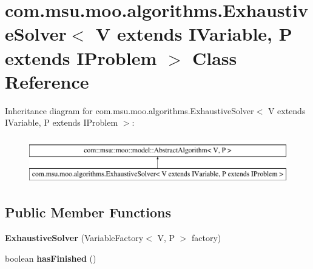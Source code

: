 \hypertarget{classcom_1_1msu_1_1moo_1_1algorithms_1_1ExhaustiveSolver_3_01V_01extends_01IVariable_00_01P_01extends_01IProblem_01_4}{\section{com.\-msu.\-moo.\-algorithms.\-Exhaustive\-Solver$<$ V extends I\-Variable, P extends I\-Problem $>$ Class Reference}
\label{classcom_1_1msu_1_1moo_1_1algorithms_1_1ExhaustiveSolver_3_01V_01extends_01IVariable_00_01P_01extends_01IProblem_01_4}
}
Inheritance diagram for com.\-msu.\-moo.\-algorithms.\-Exhaustive\-Solver$<$ V extends I\-Variable, P extends I\-Problem $>$\-:\begin{figure}[H]
\begin{center}
\leavevmode
\includegraphics[height=2.000000cm]{classcom_1_1msu_1_1moo_1_1algorithms_1_1ExhaustiveSolver_3_01V_01extends_01IVariable_00_01P_01extends_01IProblem_01_4}
\end{center}
\end{figure}
\subsection*{Public Member Functions}
\begin{DoxyCompactItemize}
\item 
\hypertarget{classcom_1_1msu_1_1moo_1_1algorithms_1_1ExhaustiveSolver_3_01V_01extends_01IVariable_00_01P_01extends_01IProblem_01_4_adecccb0b347653f660431490c7256c00}{{\bfseries Exhaustive\-Solver} (Variable\-Factory$<$ V, P $>$ factory)}\label{classcom_1_1msu_1_1moo_1_1algorithms_1_1ExhaustiveSolver_3_01V_01extends_01IVariable_00_01P_01extends_01IProblem_01_4_adecccb0b347653f660431490c7256c00}

\item 
\hypertarget{classcom_1_1msu_1_1moo_1_1algorithms_1_1ExhaustiveSolver_3_01V_01extends_01IVariable_00_01P_01extends_01IProblem_01_4_ae8001f969408d4b41260ae762ea65169}{boolean {\bfseries has\-Finished} ()}\label{classcom_1_1msu_1_1moo_1_1algorithms_1_1ExhaustiveSolver_3_01V_01extends_01IVariable_00_01P_01extends_01IProblem_01_4_ae8001f969408d4b41260ae762ea65169}

\end{DoxyCompactItemize}
